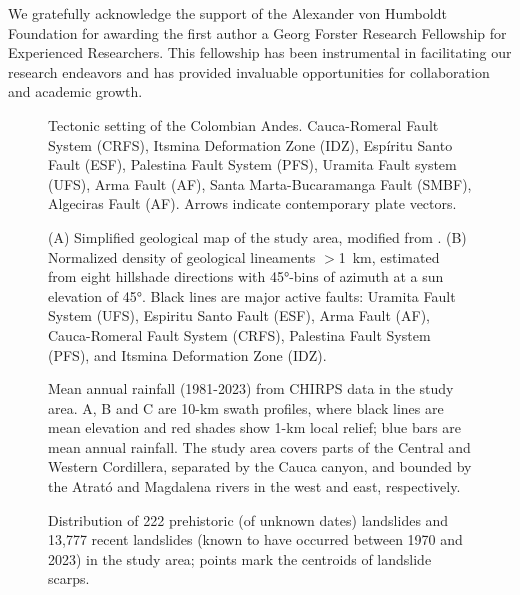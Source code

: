 \documentclass[draft]{agujournal2019}
\begin{document}
\acknowledgments
We gratefully acknowledge the support of the Alexander von Humboldt Foundation for awarding the first author a Georg Forster Research Fellowship for Experienced Researchers. This fellowship has been instrumental in facilitating our research endeavors and has provided invaluable opportunities for collaboration and academic growth.



\newpage

\begin{figure}[ht!]
    \caption{Tectonic setting of the Colombian Andes. Cauca-Romeral Fault System (CRFS), Itsmina Deformation Zone (IDZ), Espíritu Santo Fault (ESF), Palestina Fault System (PFS), Uramita Fault system (UFS), Arma Fault (AF), Santa Marta-Bucaramanga Fault (SMBF), Algeciras Fault (AF). Arrows indicate contemporary plate vectors.}
    \label{fig:marco}
\end{figure}


\begin{figure}[ht!]
    \caption{(A) Simplified geological map of the study area, modified from . (B) Normalized density of geological lineaments $>$1~km, estimated from eight hillshade directions with 45°-bins of azimuth at a sun elevation of 45°. Black lines are major active faults: Uramita Fault System (UFS), Espiritu Santo Fault (ESF), Arma Fault (AF), Cauca-Romeral Fault System (CRFS), Palestina Fault System (PFS), and Itsmina Deformation Zone (IDZ).}
    \label{fig:geologia}
\end{figure}


\begin{figure}[ht!]
    \caption{Mean annual rainfall (1981-2023) from CHIRPS data \cite{funk2015} in the study area. A, B and C are 10-km swath profiles, where black lines are mean elevation and red shades show 1-km local relief; blue bars are mean annual rainfall. The study area covers parts of the Central and Western Cordillera, separated by the Cauca canyon, and bounded by the Atrató and Magdalena rivers in the west and east, respectively.}
    \label{fig:rainfall}
\end{figure}

\begin{figure}[ht!]
    \caption{Distribution of 222 prehistoric (of unknown dates) landslides and 13,777 recent landslides (known to have occurred between 1970 and 2023) in the study area; points mark the centroids of landslide scarps.}
    \label{fig:inventory}
\end{figure}
\end{document}
